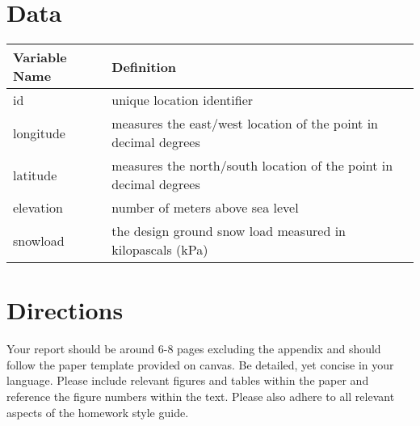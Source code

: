 \documentclass[12pt]{notes}
\begin{document}
\section*{Data}
\begin{center}
\renewcommand{\arraystretch}{1.25}
\begin{tabular}{|l | l|}
\hline
\textbf{Variable Name} & \textbf{Definition}\\ \hline
id & unique location identifier \\ \hline
longitude & measures the east/west location of the point in decimal degrees \\ \hline
latitude & measures the north/south location of the point in decimal degrees \\ \hline
elevation & number of meters above sea level \\ \hline
snowload & the design ground snow load measured in kilopascals (kPa) \\ \hline
\end{tabular}
\end{center}

\section*{Directions}
Your report should be around 6-8 pages excluding the appendix and should follow the paper template provided on canvas. Be detailed, yet concise in your language. Please include relevant figures and tables within the paper and reference the figure numbers within the text. Please also adhere to all relevant aspects of the homework style guide.


\end{document}
